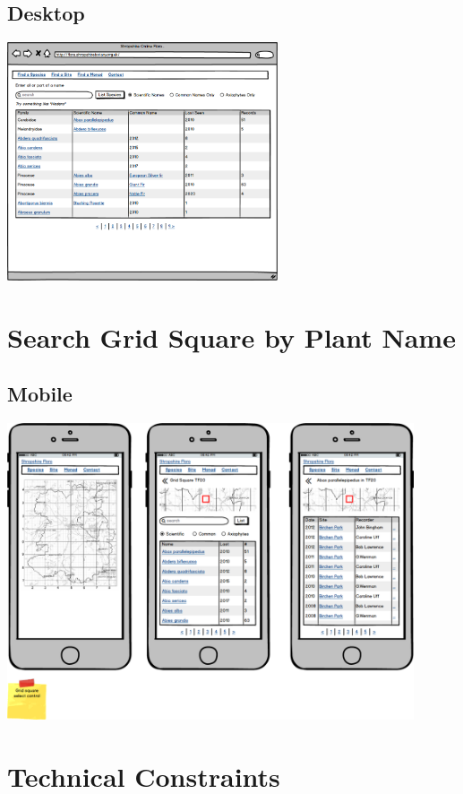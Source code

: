 \documentclass[a4paper,12pt,landscape,twocolumn]{article}
\begin{document}
\clearpage
\subsection{Desktop}
\begin{multicols}{1}
    \includegraphics[width=0.6\textwidth]{./wireframes/county-desktop.png}
\end{multicols}



\clearpage
\section{Search Grid Square by Plant Name}
\subsection{Mobile}
\begin{multicols}{1}
    \includegraphics[width=0.9\textwidth]{./wireframes/monad-mobile.png}
\end{multicols}


\section{Technical Constraints}
\end{document}
